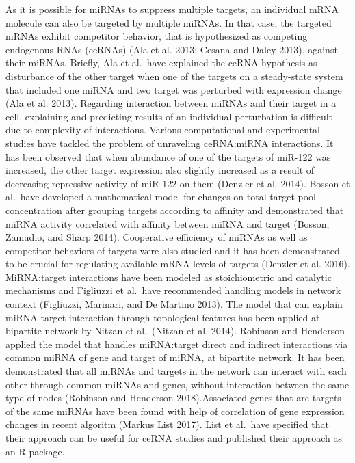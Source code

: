 \documentclass[]{article}
\begin{document}
As it is possible for miRNAs to suppress multiple targets, an individual
mRNA molecule can also be targeted by multiple miRNAs. In that case, the
targeted mRNAs exhibit competitor behavior, that is hypothesized as
competing endogenous RNAs (ceRNAs) (Ala et al. 2013; Cesana and Daley
2013), against their miRNAs. Briefly, Ala et al.~have explained the
ceRNA hypothesis as disturbance of the other target when one of the
targets on a steady-state system that included one miRNA and two target
was perturbed with expression change (Ala et al. 2013). Regarding
interaction between miRNAs and their target in a cell, explaining and
predicting results of an individual perturbation is difficult due to
complexity of interactions. Various computational and experimental
studies have tackled the problem of unraveling ceRNA:miRNA interactions.
It has been observed that when abundance of one of the targets of
miR-122 was increased, the other target expression also slightly
increased as a result of decreasing repressive activity of miR-122 on
them (Denzler et al. 2014). Bosson et al.~have developed a mathematical
model for changes on total target pool concentration after grouping
targets according to affinity and demonstrated that miRNA activity
correlated with affinity between miRNA and target (Bosson, Zamudio, and
Sharp 2014). Cooperative efficiency of miRNAs as well as competitor
behaviors of targets were also studied and it has been demonstrated to
be crucial for regulating available mRNA levels of targets (Denzler et
al. 2016). MiRNA:target interactions have been modeled as stoichiometric
and catalytic mechanisms and Figliuzzi et al.~have recommended handling
models in network context (Figliuzzi, Marinari, and De Martino 2013).
The model that can explain miRNA target interaction through topological
features has been applied at bipartite network by Nitzan et al.~(Nitzan
et al. 2014). Robinson and Henderson applied the model that handles
miRNA:target direct and indirect interactions via common miRNA of gene
and target of miRNA, at bipartite network. It has been demonstrated that
all miRNAs and targets in the network can interact with each other
through common miRNAs and genes, without interaction between the same
type of nodes (Robinson and Henderson 2018).Associated genes that are
targets of the same miRNAs have been found with help of correlation of
gene expression changes in recent algoritm (Markus List 2017). List et
al.~have specified that their approach can be useful for ceRNA studies
and published their approach as an R package.
\end{document}
